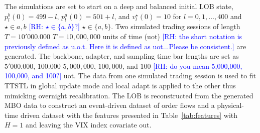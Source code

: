 \documentclass[10pt,a4paper,oneside]{article}
\newcommand{\rh}[1]{\textcolor{blue}{\textsf{[RH: #1]}}}
\providecommand{\DIFaddtex}[1]{{\protect\color{blue} \sf #1}} %
\providecommand{\DIFdeltex}[1]{{\protect\color{red} \scriptsize #1}} %
\providecommand{\DIFaddbegin}{} %
\providecommand{\DIFaddend}{} %
\providecommand{\DIFdelbegin}{} %
\providecommand{\DIFdelend}{} %
\providecommand{\DIFadd}[1]{\texorpdfstring{\DIFaddtex{#1}}{#1}} %
\providecommand{\DIFdel}[1]{\texorpdfstring{\DIFdeltex{#1}}{}} %
\newcommand{\DIFscaledelfig}{0.5}
\newlength{\DIFdelgraphicswidth} %
\newlength{\DIFdelgraphicsheight} %
\newcommand{\DIFaddincludegraphics}[2][]{{\color{blue}\fbox{\DIFOincludegraphics[#1]{#2}}}} %
\newcommand{\DIFdelincludegraphics}[2][]{%
\sbox{\DIFdelgraphicsbox}{\DIFOincludegraphics[#1]{#2}}%
\settoboxwidth{\DIFdelgraphicswidth}{\DIFdelgraphicsbox} %
\settoboxtotalheight{\DIFdelgraphicsheight}{\DIFdelgraphicsbox} %
\scalebox{\DIFscaledelfig}{%
\parbox[b]{\DIFdelgraphicswidth}{\usebox{\DIFdelgraphicsbox}\\[-\baselineskip] \rule{\DIFdelgraphicswidth}{0em}}\llap{\resizebox{\DIFdelgraphicswidth}{\DIFdelgraphicsheight}{%
\setlength{\unitlength}{\DIFdelgraphicswidth}%
\begin{picture}(1,1)%
\thicklines\linethickness{2pt} %
{\color[rgb]{1,0,0}\put(0,0){\framebox(1,1){}}}%
{\color[rgb]{1,0,0}\put(0,0){\line( 1,1){1}}}%
{\color[rgb]{1,0,0}\put(0,1){\line(1,-1){1}}}%
\end{picture}%
}\hspace*{3pt}}} %
} %
\DeclareRobustCommand{\DIFaddbegin}{\DIFOaddbegin \let\includegraphics\DIFaddincludegraphics} %
\DeclareRobustCommand{\DIFaddend}{\DIFOaddend \let\includegraphics\DIFOincludegraphics} %
\DeclareRobustCommand{\DIFdelbegin}{\DIFOdelbegin \let\includegraphics\DIFdelincludegraphics} %
\DeclareRobustCommand{\DIFdelend}{\DIFOaddend \let\includegraphics\DIFOincludegraphics} %
\begin{document}
The simulations are set to start on a deep and balanced initial LOB state, $p^b_l(0) = 499 - l$, $p^a_l(0) = 501 + l$, and $v^\star_l(0) = 10$ for $l = 0, 1, \dots, 400$ and \DIFdelbegin \DIFdel{$\star \in {a, b}$ \rh{$\star \in \{a, b\}$?}}\DIFdelend \DIFaddbegin \DIFadd{$\star \in \{a, b\}$}\DIFaddend . Two simulated trading sessions of length \DIFdelbegin \DIFdel{$T = 10'000.000$ }\DIFdelend \DIFaddbegin \DIFadd{$T = 10{,}000{,}000$ }\DIFaddend units of time (uot) \DIFdelbegin \DIFdel{\rh{the short notation is previously defined as u.o.t. Here it is defined as uot...Please be consistent.} }\DIFdelend are generated. The backbone, adapter, and sampling time bar lengths are set as \DIFdelbegin \DIFdel{$5'000.000$, $100.000$}\DIFdelend \DIFaddbegin \DIFadd{$5{,}000{,}000$, $100{,}000$}\DIFaddend , and $100$ \DIFdelbegin \DIFdel{\rh{do you mean 5,000,000, 100,000, and 100?}}\DIFdelend \DIFaddbegin \DIFadd{uot}\DIFaddend . The data from one simulated trading session is used to fit TTSTL in global update mode and local adapt is applied to the other thus mimicking overnight recalibration. The LOB is reconstructed from the generated MBO data to construct an event-driven dataset of order flows and a physical-time driven dataset with the features presented in Table~\ref{tab:features} with $H = 1$ and leaving the VIX index covariate out.
\end{document}
